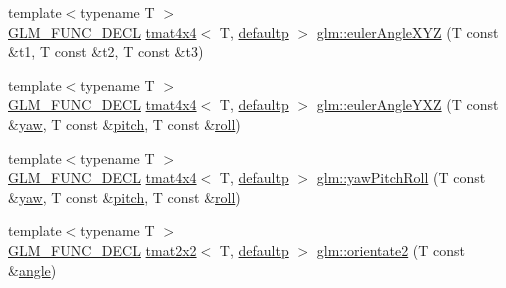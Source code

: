 \begin{DoxyCompactItemize}
\item 
{\footnotesize template$<$typename T $>$ }\\\mbox{\hyperlink{setup_8hpp_ab2d052de21a70539923e9bcbf6e83a51}{G\+L\+M\+\_\+\+F\+U\+N\+C\+\_\+\+D\+E\+CL}} \mbox{\hyperlink{structglm_1_1tmat4x4}{tmat4x4}}$<$ T, \mbox{\hyperlink{namespaceglm_a0f04f086094c747d227af4425893f545a9d21ccd8b5a009ec7eb7677befc3bf51}{defaultp}} $>$ \mbox{\hyperlink{group__gtx__euler__angles_gaaedda1657a1aebe0a904d864b33844e8}{glm\+::euler\+Angle\+X\+YZ}} (T const \&t1, T const \&t2, T const \&t3)
\item 
{\footnotesize template$<$typename T $>$ }\\\mbox{\hyperlink{setup_8hpp_ab2d052de21a70539923e9bcbf6e83a51}{G\+L\+M\+\_\+\+F\+U\+N\+C\+\_\+\+D\+E\+CL}} \mbox{\hyperlink{structglm_1_1tmat4x4}{tmat4x4}}$<$ T, \mbox{\hyperlink{namespaceglm_a0f04f086094c747d227af4425893f545a9d21ccd8b5a009ec7eb7677befc3bf51}{defaultp}} $>$ \mbox{\hyperlink{group__gtx__euler__angles_ga0242b5ab68651db70c6025815549427f}{glm\+::euler\+Angle\+Y\+XZ}} (T const \&\mbox{\hyperlink{group__gtc__quaternion_ga724a5df282b70cec0a6cb0d6dcddb6d6}{yaw}}, T const \&\mbox{\hyperlink{group__gtc__quaternion_ga2c08b93a4261c10748fd4d2104346f17}{pitch}}, T const \&\mbox{\hyperlink{group__gtc__quaternion_ga4fd705376c6c1fd667be0055a0ea58ec}{roll}})
\item 
{\footnotesize template$<$typename T $>$ }\\\mbox{\hyperlink{setup_8hpp_ab2d052de21a70539923e9bcbf6e83a51}{G\+L\+M\+\_\+\+F\+U\+N\+C\+\_\+\+D\+E\+CL}} \mbox{\hyperlink{structglm_1_1tmat4x4}{tmat4x4}}$<$ T, \mbox{\hyperlink{namespaceglm_a0f04f086094c747d227af4425893f545a9d21ccd8b5a009ec7eb7677befc3bf51}{defaultp}} $>$ \mbox{\hyperlink{group__gtx__euler__angles_gaf9c8d0f1df88c5344165600774489bc5}{glm\+::yaw\+Pitch\+Roll}} (T const \&\mbox{\hyperlink{group__gtc__quaternion_ga724a5df282b70cec0a6cb0d6dcddb6d6}{yaw}}, T const \&\mbox{\hyperlink{group__gtc__quaternion_ga2c08b93a4261c10748fd4d2104346f17}{pitch}}, T const \&\mbox{\hyperlink{group__gtc__quaternion_ga4fd705376c6c1fd667be0055a0ea58ec}{roll}})
\item 
{\footnotesize template$<$typename T $>$ }\\\mbox{\hyperlink{setup_8hpp_ab2d052de21a70539923e9bcbf6e83a51}{G\+L\+M\+\_\+\+F\+U\+N\+C\+\_\+\+D\+E\+CL}} \mbox{\hyperlink{structglm_1_1tmat2x2}{tmat2x2}}$<$ T, \mbox{\hyperlink{namespaceglm_a0f04f086094c747d227af4425893f545a9d21ccd8b5a009ec7eb7677befc3bf51}{defaultp}} $>$ \mbox{\hyperlink{group__gtx__euler__angles_ga6f465681cbbc575ad93a53ec918dacf3}{glm\+::orientate2}} (T const \&\mbox{\hyperlink{group__gtc__quaternion_gad4a4448baedb198b2b1e7880d2544dc9}{angle}})

\end{DoxyCompactItemize}
